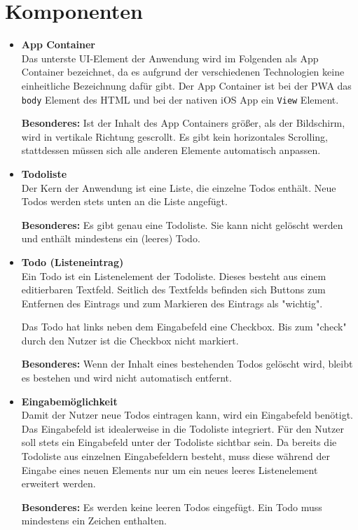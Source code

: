 \section{Komponenten}
\begin{itemize}
    \item \textbf{App Container}\\
    Das unterste UI-Element der Anwendung wird im Folgenden als App Container bezeichnet, da es aufgrund der verschiedenen Technologien keine einheitliche Bezeichnung dafür gibt. Der App Container ist bei der PWA das \texttt{body} Element des HTML und bei der nativen iOS App ein \texttt{View} Element.
    
    \textbf{Besonderes:} Ist der Inhalt des App Containers größer, als der Bildschirm, wird in vertikale Richtung gescrollt. Es gibt kein horizontales Scrolling, stattdessen müssen sich alle anderen Elemente automatisch anpassen.

    \item \textbf{Todoliste}\\
    Der Kern der Anwendung ist eine Liste, die einzelne Todos enthält. Neue Todos werden stets unten an die Liste angefügt.
    
    \textbf{Besonderes:} Es gibt genau eine Todoliste. Sie kann nicht gelöscht werden und enthält mindestens ein (leeres) Todo.
    
    \item \textbf{Todo (Listeneintrag)}\\
    Ein Todo ist ein Listenelement der Todoliste. Dieses besteht aus einem editierbaren Textfeld. Seitlich des Textfelds befinden sich Buttons zum Entfernen des Eintrags und zum Markieren des Eintrags als "wichtig".
    
    Das Todo hat links neben dem Eingabefeld eine Checkbox. Bis zum "check" durch den Nutzer ist die Checkbox nicht markiert.
    
    \textbf{Besonderes:} Wenn der Inhalt eines bestehenden Todos gelöscht wird, bleibt es bestehen und wird nicht automatisch entfernt.
    
    \item \textbf{Eingabemöglichkeit}\\
    Damit der Nutzer neue Todos eintragen kann, wird ein Eingabefeld benötigt. Das Eingabefeld ist idealerweise in die Todoliste integriert. Für den Nutzer soll stets ein Eingabefeld unter der Todoliste sichtbar sein.
    Da bereits die Todoliste aus einzelnen Eingabefeldern besteht, muss diese während der Eingabe eines neuen Elements nur um ein neues leeres Listenelement erweitert werden.
    
    \textbf{Besonderes:} Es werden keine leeren Todos eingefügt. Ein Todo muss mindestens ein Zeichen enthalten.
\end{itemize}

